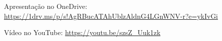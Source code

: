 Apresentação no OneDrive: \url{https://1drv.ms/p/s!AgRBucATAhUblzAldnG4LGnWNV-r?e=ykIvGi} \\
\begin{center}
    \href{https://1drv.ms/p/s!AgRBucATAhUblzAldnG4LGnWNV-r?e=ykIvGi}{
    }
\end{center}




Vídeo no YouTube: \url{https://youtu.be/szsZ_Uuk1zk} \\
\begin{center}
    \href{https://youtu.be/szsZ_Uuk1zk}{
    }
\end{center}
